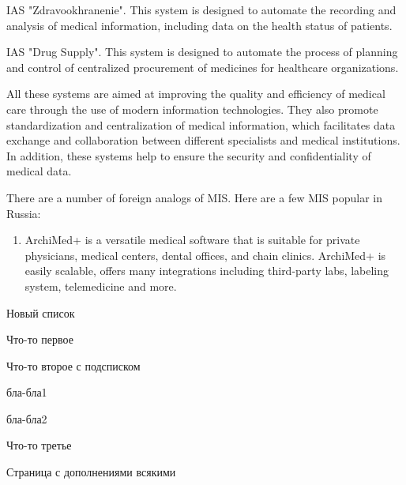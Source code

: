 \documentclass[10pt, a4paper]{article}
\renewenvironment{itemize}{
    \begin{list}{\labelitemi}{
    \setlength{\topsep}{0pt}
    \setlength{\partopsep}{0pt}
    \setlength{\parskip}{0pt}
    \setlength{\itemsep}{0pt}
    \setlength{\parsep}{0pt}
    }
}{\end{list}}
\begin{document}
\begin{multicols}{2}
\begin{enumerate}
\begin{itemize}
        \item IAS "Zdravookhranenie". This system is designed to automate the recording and analysis of medical information, including data on the health status of patients.
        \item IAS "Drug Supply". This system is designed to automate the process of planning and control of centralized procurement of medicines for healthcare organizations.
    \end{itemize}
\end{enumerate}
\par All these systems are aimed at improving the quality and efficiency of medical care through the use of
modern information technologies. They also promote
standardization and centralization of medical information, which facilitates data exchange and collaboration
between different specialists and medical institutions. In
addition, these systems help to ensure the security and
confidentiality of medical data.
\par  There are a number of foreign analogs of MIS. Here
are a few MIS popular in Russia:
\begin{enumerate}
    \item ArchiMed+ is a versatile medical software that is suitable for private physicians, medical centers, dental offices, and chain clinics. ArchiMed+ is easily scalable, offers many integrations including third-party labs, labeling system, telemedicine and more.
\end{enumerate}

\end{multicols}
\clearpage
Новый список
\begin{enumerate}
    \item Что-то первое
    \item Что-то второе с подсписком
    \begin{itemize}
        \item бла-бла1
        \item бла-бла2
    \end{itemize}
    \item Что-то третье
\end{enumerate}

\clearpage

Страница с дополнениями всякими
\end{document}
